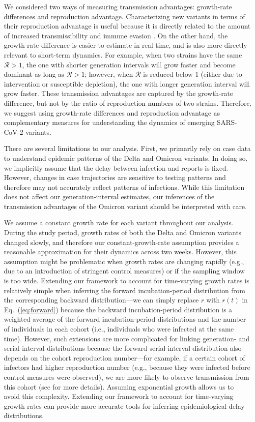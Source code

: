 \documentclass[12pt]{article}
\newcommand{\eref}[1]{Eq.~(\ref{eq:#1})}
\newcommand{\RR}{\ensuremath{{\mathcal R}}\xspace}
\begin{document}
We considered two ways of measuring transmission advantages: growth-rate differences and reproduction advantage.
Characterizing new variants in terms of their reproduction advantage is useful because it is directly related to the amount of increased transmissibility and immune evasion \citep{pearson2021bounding}.
On the other hand, the growth-rate difference is easier to estimate in real time, and is also more directly relevant to short-term dynamics. 
For example, when two strains have the same $\RR>1$, the one with shorter generation intervals will grow faster and become dominant as long as $\RR>1$;
however, when $\RR$ is reduced below 1 (either due to intervention or susceptible depletion), the one with longer generation interval will grow faster.
These transmission advantages are captured by the growth-rate difference, but not by the ratio of reproduction numbers of two strains.
Therefore, we suggest using growth-rate differences and reproduction advantage as complementary measures for understanding the dynamics of emerging SARS-CoV-2 variants.

There are several limitations to our analysis.
First, we primarily rely on case data to understand epidemic patterns of the Delta and Omicron variants.
In doing so, we implicitly assume that the delay between infection and reports is fixed.
However, changes in case trajectories are sensitive to testing patterns and therefore may not accurately reflect patterns of infections.
While this limitation does not affect our generation-interval estimates, our inferences of the transmission advantages of the Omicron variant should be interpreted with care.

We assume a constant growth rate for each variant throughout our analysis.
During the study period, growth rates of both the Delta and Omicron variants changed slowly, and therefore our constant-growth-rate assumption provides a reasonable approximation for their dynamics across two weeks.
However, this assumption might be problematic when growth rates are changing rapidly (e.g., due to an introduction of stringent control measures) or if the sampling window is too wide.
Extending our framework to account for time-varying growth rates is relatively simple when inferring the forward incubation-period distribution from the corresponding backward distribution---we can simply replace $r$ with $r(t)$ in \eref{forward} because the backward incubation-period distribution is a weighted average of the forward incubation-period distributions and the number of individuals in each cohort (i.e., individuals who were infected at the same time).
However, such extensions are more complicated for linking generation- and serial-interval distributions because the forward serial-interval distribution also depends on the cohort reproduction number---for example, if a certain cohort of infectors had higher reproduction number (e.g., because they were infected before control measures were observed), we are more likely to observe transmission from this cohort (see \citep{park2021forward} for more details).
Assuming exponential growth allows us to avoid this complexity.
Extending our framework to account for time-varying growth rates can provide more accurate tools for inferring epidemiological delay distributions.
\end{document}
